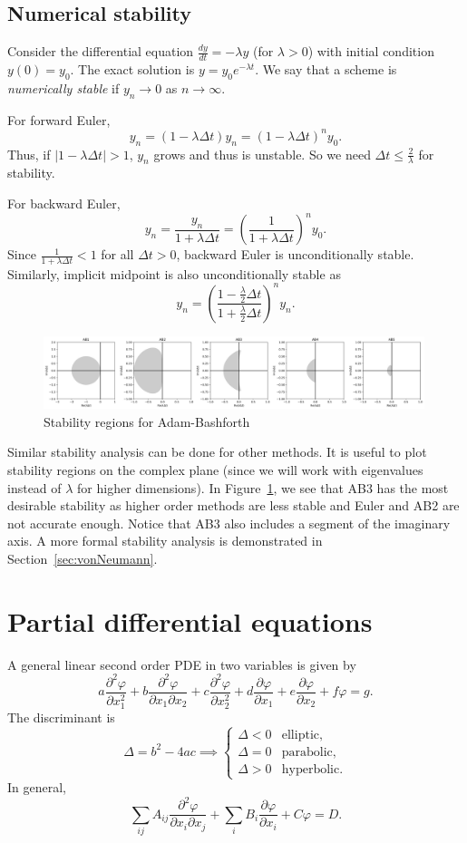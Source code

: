 \documentclass[11pt, a4paper]{article}
\renewcommand{\phi}{\varphi}
\theoremstyle{break}
\newcommand*{\Paren}[1]{\left(#1\right)}%
\newcommand{\dt}{\Delta t}
\newcommand{\der}[2]{\frac{\partial #1}{\partial #2}}
\newcommand{\pder}[3][2]{\frac{\partial^#1 #2}{\partial #3^#1}}
\newcommand{\dder}[2]{\frac{d #1}{d #2}}
\begin{document}
\subsection{Numerical stability}
Consider the differential equation $\dder yt=-\lambda y$ (for $\lambda>0$) with initial condition $y(0)=y_0$. The exact solution is $y=y_0e^{-\lambda t}$. We say that a scheme is \emph{numerically stable} if $y_n\to 0$ as $n\to \infty$.

For forward Euler, \[y_{n}=(1-\lambda \dt)y_n =(1-\lambda \dt)^ny_0.\] Thus, if $|1-\lambda \dt|>1$, $y_n$ grows and thus is unstable. So we need $\dt\leq\frac2\lambda$ for stability. 

For backward Euler, \[y_n=\frac{y_n}{1+\lambda \dt}=\Paren{\frac{1}{1+\lambda\dt}}^ny_0.\] Since $\frac{1}{1+\lambda\dt}<1$ for all $\dt>0$, backward Euler is unconditionally stable. Similarly, implicit midpoint is also unconditionally stable as \[y_n=\Paren{\frac{1-\frac\lambda2\dt}{1+\frac\lambda2\dt}}^ny_n.\]
\begin{figure}\centering
	\includegraphics[width=0.99\textwidth]{ABstab}
	\caption{Stability regions for Adam-Bashforth}\label{fig:ABstab}
\end{figure}

Similar stability analysis can be done for other methods. It is useful to plot stability regions on the complex plane (since we will work with eigenvalues instead of $\lambda$ for higher dimensions). In Figure~\ref{fig:ABstab}, we see that AB3 has the most desirable stability as higher order methods are less stable and Euler and AB2 are not accurate enough. Notice that AB3 also includes a segment of the imaginary axis. A more formal stability analysis is demonstrated in Section~\ref{sec:vonNeumann}. 

\section{Partial differential equations}
	A general linear second order PDE in two variables is given by \[a\pder\phi{x_1}+b\frac{\partial^2\phi}{\partial x_1\partial x_2}+c\pder\phi{x_2}+d\der\phi{x_1}+e\der\phi{x_2}+f\phi = g.\]
The discriminant is \[\Delta = b^2-4ac \implies \begin{cases}
	\Delta<0 & \text{elliptic},\\ \Delta =0& \text{parabolic}, \\\Delta>0 &\text{hyperbolic}.
\end{cases}\]
In general, \[\sum_{ij}A_{ij}\frac{\partial^2\phi}{\partial x_i\partial x_j}+\sum_i B_i\der\phi{x_i}+C\phi = D.\]
\end{document}
